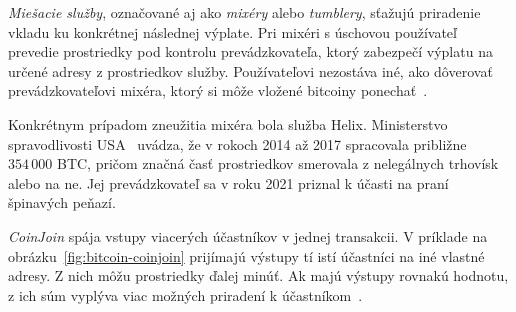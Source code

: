 \emph{Miešacie služby}, označované aj ako \emph{mixéry} alebo
\emph{tumblery}, sťažujú priradenie vkladu ku konkrétnej následnej
výplate. Pri mixéri s úschovou používateľ prevedie prostriedky
pod kontrolu prevádzkovateľa, ktorý zabezpečí výplatu na určené
adresy z prostriedkov služby. Používateľovi nezostáva iné, ako
dôverovať prevádzkovateľovi mixéra, ktorý si môže vložené
bitcoiny ponechať~\cite{ruffing2014coinshuffle}.

Konkrétnym prípadom zneužitia mixéra bola služba Helix.
Ministerstvo spravodlivosti USA~\cite{doj2026helix} uvádza,
že v rokoch 2014 až 2017 spracovala približne $354\,000$ BTC,
pričom značná časť prostriedkov smerovala z nelegálnych trhovísk
alebo na ne. Jej prevádzkovateľ sa v roku 2021 priznal k účasti
na praní špinavých peňazí.

\emph{CoinJoin} spája vstupy viacerých účastníkov v jednej
transakcii. V príklade na obrázku~\ref{fig:bitcoin-coinjoin}
prijímajú výstupy tí istí účastníci na iné vlastné adresy.
Z nich môžu prostriedky ďalej minúť. Ak majú výstupy rovnakú
hodnotu, z ich súm vyplýva viac možných priradení
k účastníkom~\cite{stutz2022coinjoin}.

\begin{center}
  \begin{minipage}{\textwidth}
  \centering
  \captionsetup{type=figure}
  \caption{Spoločná transakcia CoinJoin.}
  \label{fig:bitcoin-coinjoin}
  \end{minipage}
\end{center}

